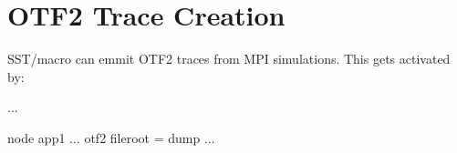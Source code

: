 
\section{OTF2 Trace Creation}
\label{sec:otf:traceEmission}
SST/macro can emmit OTF2 traces from MPI simulations. This gets activated by:

\begin{ViFile}
...

node {
 app1 {
  ...
    otf2 {
      fileroot = dump
    }
  ...
 }
}

\end{ViFile}


